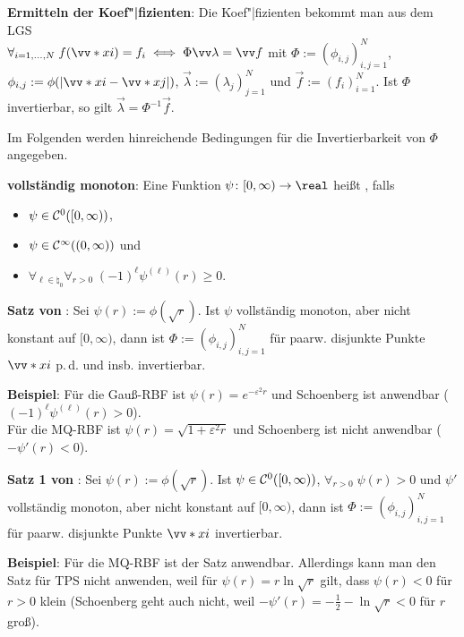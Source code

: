 \textbf{Ermitteln der Koef"|fizienten}:
Die Koef"|fizienten bekommt man aus dem LGS\\
$\forall_{i=1,\dotsc,N}\; f(\vecs{x}{i}) = f_i
\iff \Phi\vec{\lambda} = \vec{f}$
mit $\Phi := (\phi_{i,j})_{i,j=1}^N$, $\phi_{i,j} := \phi(|\vecs{x}{i} - \vecs{x}{j}|)$,
$\vec{\lambda} := (\lambda_j)_{j=1}^N$ und $\vec{f} := (f_i)_{i=1}^N$.
Ist $\Phi$ invertierbar, so gilt $\vec{\lambda} = \Phi^{-1} \vec{f}$.

\linie

Im Folgenden werden hinreichende Bedingungen für die Invertierbarkeit von $\Phi$
angegeben.

\textbf{vollständig monoton}:
Eine Funktion $\psi\colon [0, \infty) \to \real$ heißt , falls
\begin{itemize}
    \item
    $\psi \in \mathcal{C}^0([0, \infty))$,

    \item
    $\psi \in \mathcal{C}^\infty((0, \infty))$ und

    \item
    $\forall_{\ell \in \natural_0} \forall_{r > 0}\; (-1)^\ell \psi^{(\ell)}(r) \ge 0$.
\end{itemize}

\textbf{Satz von }:
Sei $\psi(r) := \phi(\sqrt{r})$.
Ist $\psi$ vollständig monoton, aber nicht konstant auf $[0, \infty)$,
dann ist $\Phi := (\phi_{i,j})_{i,j=1}^N$ für paarw. disjunkte Punkte
$\vecs{x}{i}$ p.\,d. und insb. invertierbar.

\textbf{Beispiel}:
Für die Gauß-RBF ist $\psi(r) = e^{-\varepsilon^2 r}$
und Schoenberg ist anwendbar
($(-1)^\ell \psi^{(\ell)}(r) > 0$).\\
Für die MQ-RBF ist $\psi(r) = \sqrt{1 + \varepsilon^2 r}$
und Schoenberg ist nicht anwendbar
($-\psi'(r) < 0$).

\linie

\textbf{Satz 1 von }:
Sei $\psi(r) := \phi(\sqrt{r})$.
Ist $\psi \in \mathcal{C}^0([0, \infty))$,
$\forall_{r>0}\; \psi(r) > 0$ und
$\psi'$ vollständig monoton, aber nicht konstant auf $[0, \infty)$,
dann ist $\Phi := (\phi_{i,j})_{i,j=1}^N$ für paarw. disjunkte Punkte
$\vecs{x}{i}$ invertierbar.

\textbf{Beispiel}:
Für die MQ-RBF ist der Satz anwendbar.
Allerdings kann man den Satz für TPS nicht anwenden,
weil für $\psi(r) = r \ln\sqrt{r}$ gilt,
dass $\psi(r) < 0$ für $r > 0$ klein
(Schoenberg geht auch nicht, weil $-\psi'(r) = -\frac{1}{2} - \ln\sqrt{r} < 0$
für $r$ groß).

